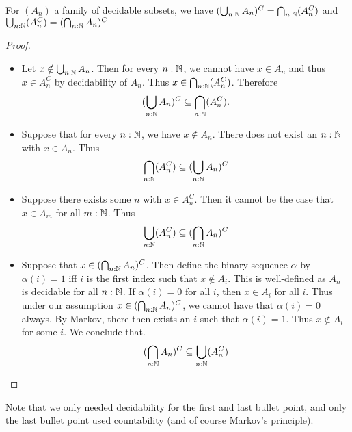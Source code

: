 \begin{lemma}\label{LemDecidableSubsetsDeMorgan}
  For $(A_n)$ a family of decidable subsets, we have
    $
    (\bigcup_{n:\mathbb{N}} A_n)^C
    =
    \bigcap_{n:\mathbb{N}} (A_n^C)
    $ 
    and 
    $
    \bigcup_{n:\mathbb{N}} (A_n^C)
    =  
    (\bigcap_{n:\mathbb{N}} A_n)^C
    $
\end{lemma}

\begin{proof}
\begin{itemize}
  \item 
    Let 
    $x\notin \bigcup_{n:\mathbb{N}} A_n$. 
    Then for every $n:\mathbb{N}$, we cannot have $x\in A_n$
    and thus $x\in A_n^C$ by decidability of $A_n$. 
    Thus $x\in \bigcap_{n:\mathbb{N}} (A_n^C)$. 
    Therefore
    $$
    (\bigcup_{n:\mathbb{N}} A_n)^C
    \subseteq 
    \bigcap_{n:\mathbb{N}} (A_n^C).
    $$ 
  \item 
    Suppose that for every $n:\mathbb{N}$, we have $x\notin A_n$. 
    There does not exist an $n:\mathbb{N}$ with $x\in A_n$. Thus
    $$
    \bigcap_{n:\mathbb{N}} (A_n^C)
    \subseteq 
    (\bigcup_{n:\mathbb{N}} A_n)^C
    $$ 
  \item 
    Suppose there exists some $n$ with $x\in A_n^C$. Then 
    it cannot be the case that $x\in A_m$ for all $m:\mathbb{N}$.
    Thus
    $$
    \bigcup_{n:\mathbb{N}} (A_n^C)
    \subseteq 
    (\bigcap_{n:\mathbb{N}} A_n)^C
    $$ 
  \item 
    Suppose that $x\in (\bigcap_{n:\mathbb{N}} A_n)^C$. 
    Then define the binary sequence $\alpha$ by $\alpha(i) =1$ iff $i$ is the first index such that 
    $x\notin A_i$. This is well-defined as $A_n$ is decidable for all $n:\mathbb{N}$. 
    If $\alpha(i) = 0$ for all $i$, then $x\in A_i$ for all $i$. 
    Thus under our assumption $x\in (\bigcap_{n:\mathbb{N}} A_n)^C$, 
    we cannot have that $\alpha(i) = 0$ always. 
    By Markov, there then exists an $i$ such that $\alpha(i) = 1$. 
    Thus $x\notin A_i$ for some $i$. We conclude that. 
    $$
    (\bigcap_{n:\mathbb{N}} A_n)^C
    \subseteq
    \bigcup_{n:\mathbb{N}} (A_n^C)
    $$ 
\end{itemize}
\end{proof} 
Note that we only needed decidability for the first and last bullet point, 
and only the last bullet point used countability (and of course Markov's principle). 
